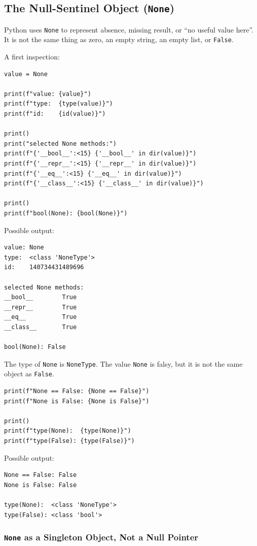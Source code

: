 \subsection{The Null-Sentinel Object (\texttt{None})}

Python uses \texttt{None} to represent absence, missing result, or ``no useful value here''. It is not the same thing as zero, an empty string, an empty list, or \texttt{False}.

A first inspection:

\begin{verbatim}
value = None

print(f"value: {value}")
print(f"type:  {type(value)}")
print(f"id:    {id(value)}")

print()
print("selected None methods:")
print(f"{'__bool__':<15} {'__bool__' in dir(value)}")
print(f"{'__repr__':<15} {'__repr__' in dir(value)}")
print(f"{'__eq__':<15} {'__eq__' in dir(value)}")
print(f"{'__class__':<15} {'__class__' in dir(value)}")

print()
print(f"bool(None): {bool(None)}")
\end{verbatim}

Possible output:

\begin{verbatim}
value: None
type:  <class 'NoneType'>
id:    140734431489696

selected None methods:
__bool__        True
__repr__        True
__eq__          True
__class__       True

bool(None): False
\end{verbatim}

The type of \texttt{None} is \texttt{NoneType}. The value \texttt{None} is falsy, but it is not the same object as \texttt{False}.

\begin{verbatim}
print(f"None == False: {None == False}")
print(f"None is False: {None is False}")

print()
print(f"type(None):  {type(None)}")
print(f"type(False): {type(False)}")
\end{verbatim}

Possible output:

\begin{verbatim}
None == False: False
None is False: False

type(None):  <class 'NoneType'>
type(False): <class 'bool'>
\end{verbatim}

\subsubsection{\texttt{None} as a Singleton Object, Not a Null Pointer}

